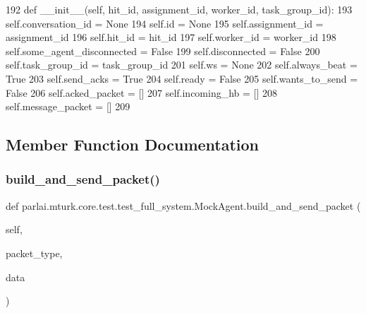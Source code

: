 \begin{DoxyCode}
192     \textcolor{keyword}{def }\_\_init\_\_(self, hit\_id, assignment\_id, worker\_id, task\_group\_id):
193         self.conversation\_id = \textcolor{keywordtype}{None}
194         self.id = \textcolor{keywordtype}{None}
195         self.assignment\_id = assignment\_id
196         self.hit\_id = hit\_id
197         self.worker\_id = worker\_id
198         self.some\_agent\_disconnected = \textcolor{keyword}{False}
199         self.disconnected = \textcolor{keyword}{False}
200         self.task\_group\_id = task\_group\_id
201         self.ws = \textcolor{keywordtype}{None}
202         self.always\_beat = \textcolor{keyword}{True}
203         self.send\_acks = \textcolor{keyword}{True}
204         self.ready = \textcolor{keyword}{False}
205         self.wants\_to\_send = \textcolor{keyword}{False}
206         self.acked\_packet = []
207         self.incoming\_hb = []
208         self.message\_packet = []
209 
\end{DoxyCode}


\subsection{Member Function Documentation}
\mbox{\label{classparlai_1_1mturk_1_1core_1_1test_1_1test__full__system_1_1MockAgent_aea4e710be39de9f90e3dd9b9b6882874}} 
\subsubsection{\texorpdfstring{build\+\_\+and\+\_\+send\+\_\+packet()}{build\_and\_send\_packet()}}
{\footnotesize\ttfamily def parlai.\+mturk.\+core.\+test.\+test\+\_\+full\+\_\+system.\+Mock\+Agent.\+build\+\_\+and\+\_\+send\+\_\+packet (\begin{DoxyParamCaption}\item[{}]{self,  }\item[{}]{packet\+\_\+type,  }\item[{}]{data }\end{DoxyParamCaption})}



